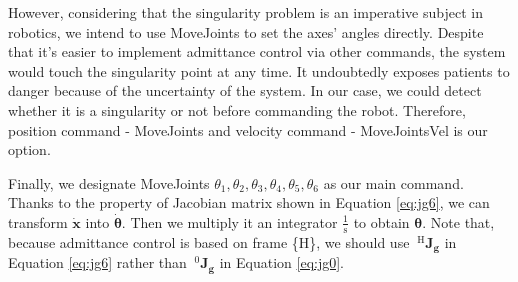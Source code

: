 \par
However, considering that the singularity problem is an imperative subject in robotics, we intend to use MoveJoints to set the axes' angles directly. Despite that it's easier to implement admittance control via other commands, the system would touch the singularity point at any time. It undoubtedly exposes patients to danger because of the uncertainty of the system. In our case, we could detect whether it is a singularity or not before commanding the robot. Therefore, position command - MoveJoints and velocity command - MoveJointsVel is our option. 
\par
Finally, we designate MoveJoints $\theta _1, \theta _2 ,\theta _3 ,\theta _4 ,\theta _5 , \theta _6 $ as our main command. Thanks to the property of Jacobian matrix shown in Equation \ref{eq:jg6}, we can transform $\boldsymbol{\dot{x}}$ into $\boldsymbol{\dot{\theta}}$. Then we multiply it an integrator $\frac{1}{\mathrm{s}}$
to obtain $\boldsymbol{\theta}$. Note that, because admittance control is based on frame \{H\}, we should use $\ ^{\mathrm{H}}\!\mathbf{J_g}$ in Equation \ref{eq:jg6} rather than $\ ^{0}\!\mathbf{J_g}$ in Equation \ref{eq:jg0}. 
